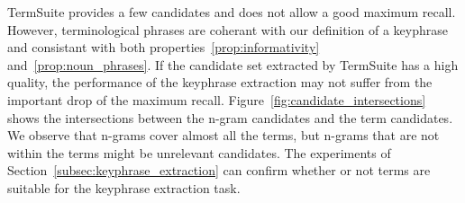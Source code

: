       TermSuite provides a few candidates and does not allow a good maximum
      recall. However, terminological phrases are coherant with our definition
      of a keyphrase and consistant with both
      properties~\ref{prop:informativity} and~\ref{prop:noun_phrases}. If the
      candidate set extracted by TermSuite has a high quality, the performance
      of the keyphrase extraction may not suffer from the important drop of the
      maximum recall. Figure~\ref{fig:candidate_intersections} shows the
      intersections between the n-gram candidates and the term candidates. We
      observe that n-grams cover almost all the terms, but n-grams that are not
      within the terms might be unrelevant candidates. The experiments of
      Section~\ref{subsec:keyphrase_extraction} can confirm whether or not terms
      are suitable for the keyphrase extraction task.

